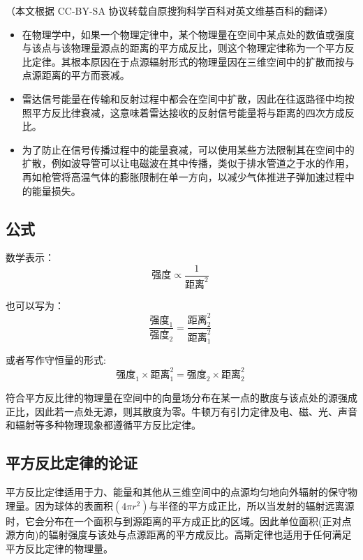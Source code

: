 
（本文根据 CC-BY-SA 协议转载自原搜狗科学百科对英文维基百科的翻译）

\begin{itemize}
\item 在物理学中，如果一个物理定律中，某个物理量在空间中某点处的数值或强度与该点与该物理量源点的距离的平方成反比，则这个物理定律称为一个平方反比定律。其根本原因在于点源辐射形式的物理量因在三维空间中的扩散而按与点源距离的平方而衰减。
\item 雷达信号能量在传输和反射过程中都会在空间中扩散，因此在往返路径中均按照平方反比律衰减，这意味着雷达接收的反射信号能量将与距离的四次方成反比。
\item 为了防止在信号传播过程中的能量衰减，可以使用某些方法限制其在空间中的扩散，例如波导管可以让电磁波在其中传播，类似于排水管道之于水的作用，再如枪管将高温气体的膨胀限制在单一方向，以减少气体推进子弹加速过程中的能量损失。
\end{itemize}
\subsection{公式}
数学表示：
\begin{equation}
\text{强度} \propto \frac{1}{\text{距离}^2}~
\end{equation}

也可以写为：\begin{equation}
\frac{\text{强度}_1}{\text{强度}_2}=\frac{\text{距离}_2^2}{\text{距离}_1^2}~ 
\end{equation}

或者写作守恒量的形式:\begin{equation}
\text{强度}_1 \times \text{距离}_1^2 =\text{强度}_2 \times\text{距离}_2^2~
\end{equation}

符合平方反比律的物理量在空间中的向量场分布在某一点的散度与该点处的源强成正比，因此若一点处无源，则其散度为零。牛顿万有引力定律及电、磁、光、声音和辐射等多种物理现象都遵循平方反比定律。
\subsection{ 平方反比定律的论证}
平方反比定律适用于力、能量和其他从三维空间中的点源均匀地向外辐射的保守物理量。因为球体的表面积$(4\pi r^2)$与半径的平方成正比，所以当发射的辐射远离源时，它会分布在一个面积与到源距离的平方成正比的区域。因此单位面积(正对点源方向)的辐射强度与该处与点源距离的平方成反比。高斯定律也适用于任何满足平方反比定律的物理量。

